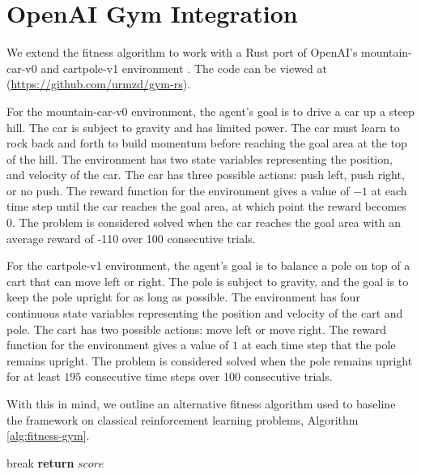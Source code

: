 \documentclass[12pt]{report}
\begin{document}
\section{OpenAI Gym Integration}
We extend the fitness algorithm to work with a Rust port  of OpenAI's mountain-car-v0 and cartpole-v1 environment \cite{1606.01540}. The code can be viewed at (\url{https://github.com/urmzd/gym-rs}).

For the mountain-car-v0 environment, the agent's goal is to drive a car up a steep hill. The car is subject to gravity and has limited power. The car must learn to rock back and forth to build momentum before reaching the goal area at the top of the hill. The environment has two state variables representing the position, and velocity of the car. The car has three possible actions: push left, push right, or no push. The reward function for the environment gives a value of $-1$ at each time step until the car reaches the goal area, at which point the reward becomes $0$. The problem is considered solved when the car reaches the goal area with an average reward of -110 over 100 consecutive trials.

For the cartpole-v1 environment, the agent's goal is to balance a pole on top of a cart that can move left or right. The pole is subject to gravity, and the goal is to keep the pole upright for as long as possible. The environment has four continuous state variables representing the position and velocity of the cart and pole. The cart has two possible actions: move left or move right. The reward function for the environment gives a value of $1$ at each time step that the pole remains upright. The problem is considered solved when the pole remains upright for at least $195$ consecutive time steps over 100 consecutive trials.

With this in mind, we outline an alternative fitness algorithm used to baseline the framework on classical reinforcement learning problems, Algorithm \ref{alg:fitness-gym}.

\begin{algorithm}[!htb]
	\caption{Fitness: Gym Integration}
	\label{alg:fitness-gym}
	\begin{algorithmic}[1]
		\State break
		\EndIf
		\EndFor
		\State \textbf{return} $score$
	\end{algorithmic}
\end{algorithm}
\end{document}
